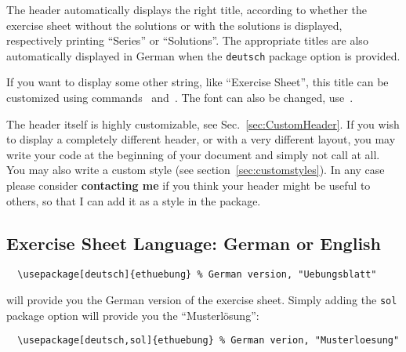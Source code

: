 \documentclass[11pt,a4paper]{article}
\begin{document}

The header automatically displays the right title, according to whether the exercise sheet
without the solutions or with the solutions is displayed, respectively printing ``Series''
or ``Solutions''. The appropriate titles are also automatically displayed in German when
the \texttt{deutsch} package option is provided.

\begin{pkgtip}
  If you want to display some other string,
  like ``Exercise Sheet'', this title can be customized using
  commands~ and~. The
  font can also be changed, use~.
\end{pkgtip}

\begin{pkgtip}
  The header itself is highly customizable, see Sec.~\ref{sec:CustomHeader}. If you wish
  to display a completely different header, or with a very different layout, you may write
  your code at the beginning of your document and simply not call
   at all. You may also write a custom style (see
  section~\ref{sec:customstyles}). In any case please consider \textbf{contacting me} if
  you think your header might be useful to others, so that I can add it as a style in the
  package.
\end{pkgtip}


\subsection{Exercise Sheet Language: German or English}
\label{sec:Language}

\begin{pkgverbatim}
\begin{verbatim}
  \usepackage[deutsch]{ethuebung} % German version, "Uebungsblatt"
\end{verbatim}
\end{pkgverbatim}
will provide you the German version of the exercise sheet. Simply adding the \texttt{sol}
package option will provide you the ``Musterl\"osung'':
\begin{pkgverbatim}
\begin{verbatim}
  \usepackage[deutsch,sol]{ethuebung} % German verion, "Musterloesung"
\end{verbatim}
\end{pkgverbatim}
\end{document}
